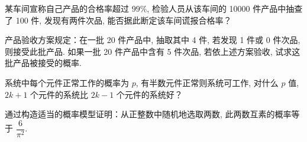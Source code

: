 \documentclass[../../main.tex]{subfiles}
\begin{document}
\begin{exercise}\label{exercise:ch02-47}
某车间宣称自己产品的合格率超过 $99\%$, 检验人员从该车间的 10000 件产品中抽查了 100 件, 发现有两件次品, 能否据此断定该车间谎报合格率？
\end{exercise}

\begin{exercise}\label{exercise:ch02-48}
产品验收方案规定：在一批 20 件产品中, 抽取其中 4 件, 若发现 1 件或 0 件次品, 则接受此批产品. 如果一批 20 件产品中含有 5 件次品, 若依上述方案验收, 试求这批产品被接受的概率.
\end{exercise}

\begin{exercise}\label{exercise:ch02-49}
系统中每个元件正常工作的概率为 $p$, 有半数元件正常则系统可工作, 对什么 $p$ 值, $2k+1$ 个元件的系统比 $2k-1$ 个元件的系统好？
\end{exercise}

\begin{exercise}\label{exercise:ch02-50}
通过构造适当的概率模型证明：从正整数中随机地选取两数, 此两数互素的概率等于 $\dfrac{6}{\pi^2}$.
\end{exercise}
\end{document}
